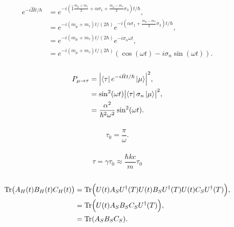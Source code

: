\documentclass[a4paper,12pt,twoside]{article}
\begin{document}
\subsubsection{}
\begin{align}
	e^{-i\hat{H}t/\hbar} &= e^{-i\left(\hat{1}\frac{m_\mu+m_\tau}{2}+\alpha\sigma_1+\frac{m_\mu-m_\tau}{2}\sigma_3\right)t/\hbar},\\
	&= e^{-i(m_\mu+m_\tau)t/(2 \hbar)}e^{-i\left(\alpha\sigma_1+\frac{m_\mu-m_\tau}{2}\sigma_3\right)t/\hbar},\\
	&= e^{-i(m_\mu+m_\tau)t/(2 \hbar)}e^{-i\sigma_n\omega t},\\
	&= e^{-i(m_\mu+m_\tau)t/(2 \hbar)}\left(\cos(\omega t)-i\sigma_n\sin(\omega t)\right).
\end{align}
\subsubsection{}
\begin{align}
	P_{\mu\rightarrow\tau} &= \abs{\bra{\tau}e^{-i\hat{H}t/\hbar}\ket{\mu}}^2,\\
	&= \sin[2](\omega t)\abs{\bra{\tau}\sigma_n\ket{\mu}}^2,\\
	&= \frac{\alpha^2}{\hbar^2\omega^2}\sin[2](\omega t).
\end{align}
\subsubsection{}
\begin{equation}
	\tau_0 = \frac{\pi}{\omega}.
\end{equation}
\subsubsection{}
\begin{equation}
	\tau = \gamma\tau_0 \approx \frac{\hbar k c}{m}\tau_0
\end{equation}
\subsection{}%
\begin{align}
	\Tr(A_H(t)B_H(t)C_H(t))
	&= \Tr(U(t)A_SU^\dagger(T)U(t)B_SU^\dagger(T)U(t)C_SU^\dagger(T)),\\
	&= \Tr(U(t)A_SB_SC_SU^\dagger(T)),\\
	&= \Tr(A_SB_SC_S).
\end{align}

\setcounter{section}{2}
\setcounter{subsection}{0}
\end{document}
